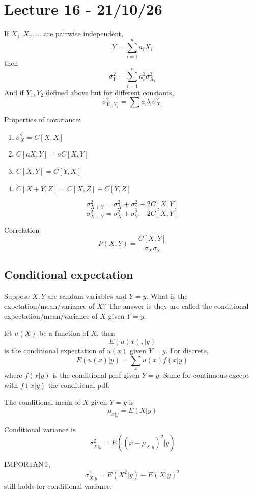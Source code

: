 \documentclass[11pt]{article}
\begin{document}
\section{Lecture 16 - 21/10/26}
\begin{theorem}
    If $X_1, X_2, \dots$ are pairwise independent, 
    \[
        Y = \sum_{i=1}^{n} a_i X_i 
    \]
    then 
    \[
        \sigma^2_Y = \sum_{i=1}^{n} a_i^2 \sigma^2_{X_i}
    \]
    And if $Y_1, Y_2$ defined above but for different constants,
    \[
        \sigma^2_{Y_1,Y_2} = \sum a_i b_i \sigma^2_{X_i}
    \]
    
\end{theorem}
\begin{theorem}
    Properties of covariance:
    \begin{enumerate}
        \item $\sigma^2_X = C[X,X]$
        \item $C[aX,Y] = aC[X,Y]$
        \item $C[X,Y] = C[Y,X]$
        \item $C[X+Y,Z] = C[X,Z] + C[Y,Z]$
    \end{enumerate}
    
\end{theorem}
\begin{theorem}
    \[
        \sigma^2_{X+Y} = \sigma_X^2+\sigma_Y^2+2C[X,Y]
    \]
     \[
        \sigma^2_{X-Y} = \sigma_X^2+\sigma_Y^2-2C[X,Y]
    \]   
\end{theorem}
\begin{definition}
    Correlation 
    \[
        P(X,Y) = \frac{C[X,Y]}{\sigma_X \sigma_Y}
    \]
    
\end{definition}
\subsection{Conditional expectation}
Suppose $X,Y$ are random variables and $Y=y$. What is the expetation/mean/variance of $X$?
The answer is they are called the conditional expectation/mean/variance of $X$ given $Y=y$.
\begin{definition}
    let $u(X)$ be a function of $X$. then 
    \[
        E(u(x),|y)
    \]
    is the conditional expectation of $u(x)$ given $Y=y$.
    For discrete,
    \[
        E(u(x)|y) = \sum_{x} u(x) f(x|y) 
    \]
    where $f(x|y)$ is the conditional pmf given $Y=y$. Same for continuous except with $f(x|y)$ the conditional pdf.
\end{definition}
\begin{definition}
    The conditional mean of $X$ given $Y=y$ is 
    \[
        \mu_{x|y} = E(X|y)
    \]
    
\end{definition}
\begin{definition}
    Conditional variance is 
    \[
        \sigma^2_{X|y} = E((x-\mu_{X|y})^2|y)
    \]
    
\end{definition}
\begin{remark}
    IMPORTANT.
    \[
        \sigma^2_{X|y} = E(X^2|y)-E(X|y)^2
    \]
    still holds for conditional variance.
\end{remark}
\end{document}
